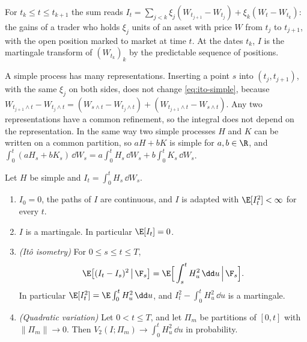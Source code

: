 For $t_k\le t\le t_{k+1}$ the sum reads
$I_t=\sum_{j<k}\xi_j(W_{t_{j+1}}-W_{t_j})+\xi_k(W_t-W_{t_k})$: the gains of a trader who
holds $\xi_j$ units of an asset with price $W$ from $t_j$ to $t_{j+1}$, with the open
position marked to market at time $t$. At the dates $t_k$, $I$ is the martingale transform
of $(W_{t_k})_k$ by the predictable sequence of positions.

A simple process has many representations. Inserting a point $s$ into $(t_j,t_{j+1})$, with
the same $\xi_j$ on both sides, does not change \eqref{eq:ito-simple}, because
$W_{t_{j+1}\wedge t}-W_{t_j\wedge t}=(W_{s\wedge t}-W_{t_j\wedge t})+(W_{t_{j+1}\wedge
t}-W_{s\wedge t})$. Any two representations have a common refinement, so the integral does
not depend on the representation. In the same way two simple processes $H$ and $K$ can be
written on a common partition, so $aH+bK$ is simple for $a,b\in\R$, and
$\int_0^t(aH_s+bK_s)\,\dd W_s=a\int_0^tH_s\,\dd W_s+b\int_0^tK_s\,\dd W_s$.

\begin{proposition}\label{prop:ito-simple}
Let $H$ be simple and $I_t=\int_0^tH_s\,\dd W_s$.
\begin{enumerate}[label=(\roman*)]
  \item $I_0=0$, the paths of $I$ are continuous, and $I$ is adapted with $\E[I_t^2]<\infty$
    for every $t$.
  \item $I$ is a martingale. In particular $\E[I_t]=0$.
  \item \emph{(It\^o isometry)} For $0\le s\le t\le T$,
    \begin{equation}\label{eq:ito-conditional-isometry}
      \E\big[(I_t-I_s)^2\,\big|\,\F_s\big]=\E\Big[\int_s^tH_u^2\,\dd u\,\Big|\,\F_s\Big].
    \end{equation}
    In particular $\E[I_t^2]=\E\int_0^tH_u^2\,\dd u$, and $I_t^2-\int_0^tH_u^2\,\dd u$ is a
    martingale.
  \item \emph{(Quadratic variation)} Let $0<t\le T$, and let $\Pi_m$ be partitions of $[0,t]$
    with $\|\Pi_m\|\to0$. Then $V_2(I;\Pi_m)\to\int_0^tH_u^2\,\dd u$ in probability.
\end{enumerate}
\end{proposition}

